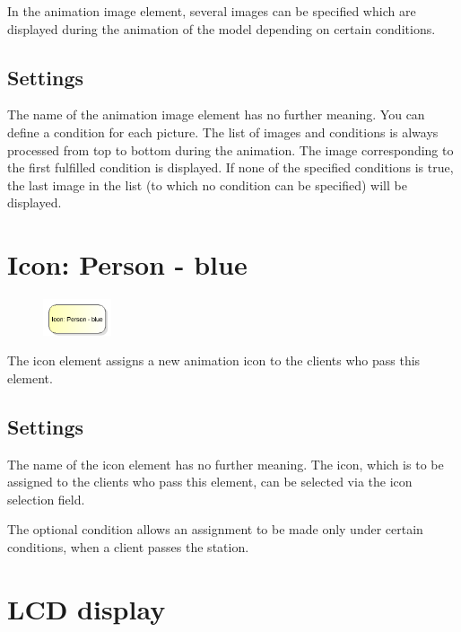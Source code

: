 In the animation image element, several images can be specified
which are displayed during the animation of the model
depending on certain conditions.

\subsection*{Settings}

The name of the animation image element has no further meaning.
You can define a condition for each picture. The list of images and conditions
is always processed from top to bottom during the animation.
The image corresponding to the first fulfilled condition is displayed.
If none of the specified conditions is true, the last image in the list
(to which no condition can be specified) will be displayed.


\section{Icon: Person - blue}
\label{ref:ModelElementClientIcon}

\begin{figure}
\vspace{-22pt}
\includegraphics[width=2cm]{imageModelElementClientIcon.png}
\vspace{-22pt}
\end{figure}

The icon element assigns a new animation icon to the clients who pass this element.

\subsection*{Settings}

The name of the icon element has no further meaning. The icon, which is to be assigned to the
clients who pass this element, can be selected via the icon selection field.

The optional condition allows an assignment to be made only under certain conditions,
when a client passes the station.


\section{LCD display}
\label{ref:ModelElementAnimationLCD}

